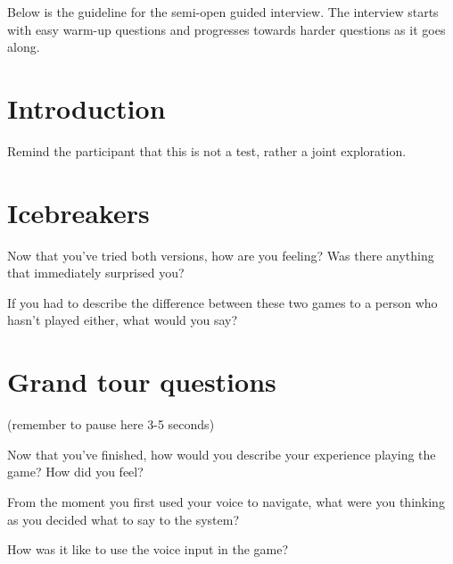 

Below is the guideline for the semi-open guided interview. 
The interview starts with easy warm-up questions and progresses towards harder questions as it goes along.

\section{Introduction}
Remind the participant that this is not a test, rather a joint exploration.

\section{Icebreakers}

\begin{QandA}
   \item Now that you’ve tried both versions, how are you feeling? Was there anything that immediately surprised you?
         \begin{answered}
         
         \end{answered}

   \item If you had to describe the difference between these two games to a person who hasn't played either, what would you say?
         \begin{answered}
         
         \end{answered}
\end{QandA}




\section{Grand tour questions}
(remember to pause here 3-5 seconds)

\begin{QandA}
   \item Now that you've finished, how would you describe your experience playing the game? How did you feel?
         \begin{answered}
         
         \end{answered}
    

   \item From the moment you first used your voice to navigate, what were you thinking as you decided what to say to the system?

         \begin{answered}
         
         \end{answered}

    \item How was it like to use the voice input in the game?
         \begin{answered}
         
         \end{answered}


\end{QandA}




